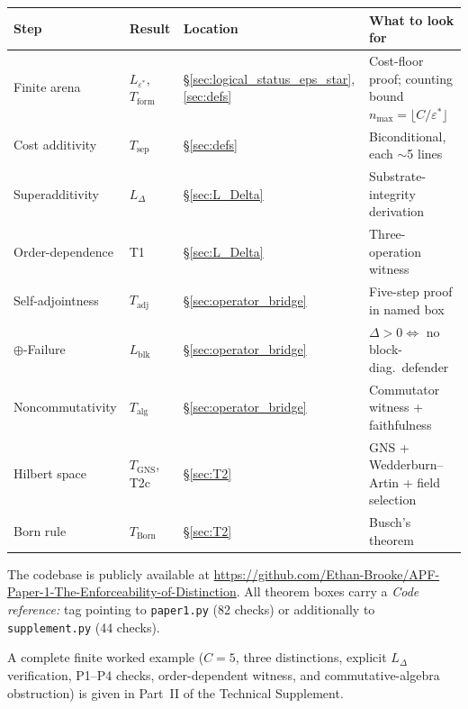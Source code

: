 \documentclass[11pt]{article}
\theoremstyle{remark}
\begin{document}
\smallskip
\begin{center}
\label{tab:proof_map}
\smallskip
\renewcommand{\arraystretch}{1.3}
\small
\begin{tabular*}{\textwidth}{@{\extracolsep{\fill}}llll@{}}
\textbf{Step} & \textbf{Result} & \textbf{Location} & \textbf{What to look for} \\[2pt]
\hline\noalign{\smallskip}
Finite arena & $L_{\varepsilon^*}$, $T_{\mathrm{form}}$ & \S\ref{sec:logical_status_eps_star}, \ref{sec:defs} & Cost-floor proof; counting bound $n_{\max} = \lfloor C/\varepsilon^*\rfloor$ \\[3pt]
Cost additivity & $T_{\mathrm{sep}}$ & \S\ref{sec:defs} & Biconditional, each $\sim$5 lines \\[3pt]
Superadditivity & $L_\Delta$ & \S\ref{sec:L_Delta} & Substrate-integrity derivation \\[3pt]
Order-dependence & T1 & \S\ref{sec:L_Delta} & Three-operation witness \\[3pt]
Self-adjointness & $T_{\mathrm{adj}}$ & \S\ref{sec:operator_bridge} & Five-step proof in named box \\[3pt]
$\oplus$-Failure & $L_{\mathrm{blk}}$ & \S\ref{sec:operator_bridge} & $\Delta > 0 \Leftrightarrow$ no block-diag.\ defender \\[3pt]
Noncommutativity & $T_{\mathrm{alg}}$ & \S\ref{sec:operator_bridge} & Commutator witness + faithfulness \\[3pt]
Hilbert space & $T_{\mathrm{GNS}}$, T2c & \S\ref{sec:T2} & GNS + Wedderburn--Artin + field selection \\[3pt]
Born rule & $T_{\mathrm{Born}}$ & \S\ref{sec:T2} & Busch's theorem \\[3pt]
\end{tabular*}
\end{center}

\smallskip\noindent The codebase is publicly available at
\url{https://github.com/Ethan-Brooke/APF-Paper-1-The-Enforceability-of-Distinction}.
All theorem boxes carry a \textit{Code reference:} tag pointing to
\texttt{paper1.py} (82 checks) or additionally to \texttt{supplement.py} (44 checks).

\smallskip\noindent A complete finite worked example ($C = 5$, three distinctions, explicit $L_\Delta$ verification, P1--P4 checks, order-dependent witness, and commutative-algebra obstruction) is given in Part~II of the Technical Supplement.\label{sec:worked_example}
\end{document}
